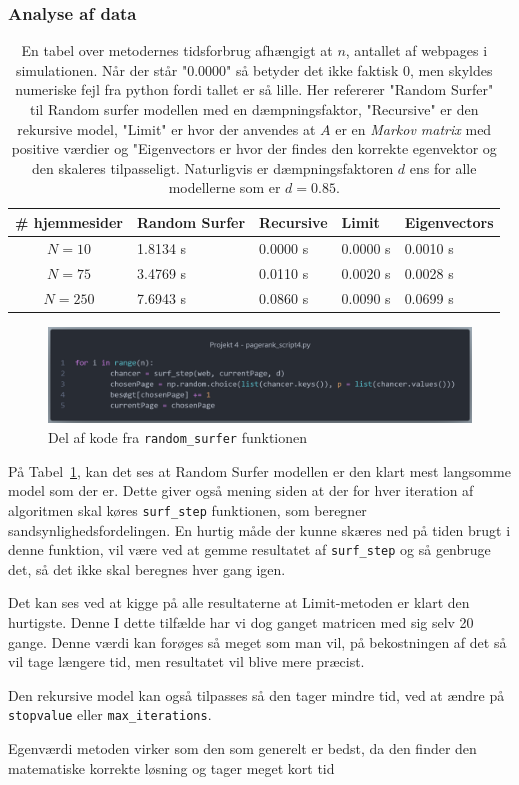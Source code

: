 \subsubsection*{Analyse af data}
\begin{table}[!h]
    \centering
    \begin{tabular}{c|l|l|l|l}
        \# hjemmesider & Random Surfer & Recursive & Limit & Eigenvectors \\
        \hline
        $N = 10$       & 1.8134 s   & 0.0000 s   & 0.0000 s   & 0.0010 s   \\
        $N = 75$       & 3.4769 s   & 0.0110 s   & 0.0020 s   & 0.0028 s   \\
        $N = 250$      & 7.6943 s   & 0.0860 s   & 0.0090 s   & 0.0699 s
    \end{tabular}
    \caption{En tabel over metodernes tidsforbrug afhængigt at $n$, antallet af webpages i simulationen. Når der står "0.0000" så betyder det ikke faktisk 0, men skyldes numeriske fejl fra python fordi tallet er så lille. Her refererer "Random Surfer" til Random surfer modellen med en dæmpningsfaktor, "Recursive" er den rekursive model, "Limit" er hvor der anvendes at $A$ er en \textit{Markov matrix} med positive værdier og "Eigenvectors er hvor der findes den korrekte egenvektor og den skaleres tilpasseligt. Naturligvis er dæmpningsfaktoren $d$ ens for alle modellerne som er $d = 0.85$.}
    \label{tidsFigur}
\end{table}

\begin{figure}
    \centering
    \includegraphics[width = \linewidth]{Kode1.png}
    \caption{Del af kode fra \texttt{random\_surfer} funktionen}
\end{figure}


På Tabel~\ref{tidsFigur}, kan det ses at Random Surfer modellen er den klart mest langsomme model som der er. Dette giver også mening siden at der for hver iteration af algoritmen skal køres \texttt{surf\_step} funktionen, som beregner sandsynlighedsfordelingen. En hurtig måde der kunne skæres ned på tiden brugt i denne funktion, vil være ved at gemme resultatet af \texttt{surf\_step} og så genbruge det, så det ikke skal beregnes hver gang igen.

Det kan ses ved at kigge på alle resultaterne at Limit-metoden er klart den hurtigste. Denne I dette tilfælde har vi dog ganget matricen med sig selv 20 gange. Denne værdi kan forøges så meget som man vil, på bekostningen af det så vil tage længere tid, men resultatet vil blive mere præcist.

Den rekursive model kan også tilpasses så den tager mindre tid, ved at ændre på \texttt{stopvalue} eller \texttt{max\_iterations}.

Egenværdi metoden virker som den som generelt er bedst, da den finder den matematiske korrekte løsning og tager meget kort tid


